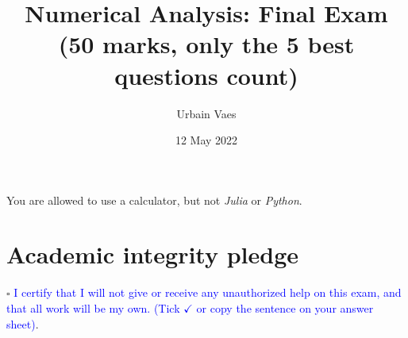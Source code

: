 \documentclass[11pt]{article}
\theoremstyle{definition}
\theoremstyle{remark}
\theoremstyle{plain}%
\begin{document}
\title{Numerical Analysis: Final Exam \\
\small{(\textbf{50 marks}, only the 5 best questions count)}}
\author{Urbain Vaes}
\date{12 May 2022}
\maketitle

\noindent You are allowed to use a calculator, but not \emph{Julia} or \emph{Python}.

\section*{Academic integrity pledge}
\noindent $\square$ \textcolor{blue}{I certify that I will not give or receive any unauthorized help on this exam,
and that all work will be my own. (Tick $\checkmark$ or copy the sentence on your answer sheet)}.
\end{document}
